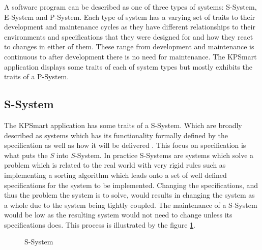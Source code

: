 \documentclass{style/CRPITStyle}
\renewcommand{\cite}{\citep}
\begin{document}
A software program can be described as one of three types of systems:
S-System, E-System and P-System. Each type of system has a varying set of traits
to their development and maintenance cycles as they have different relationships
to their environments and specifications that they were designed for and how
they react to changes in either of them. These range from development
and maintenance is continuous to after development there is no need for
maintenance. The KPSmart application displays some traits of each of system
types but mostly exhibits the traits of a P-System.

\subsection{S-System}

The KPSmart application has some traits of a S-System. Which are broadly described as
systems which has its functionality formally defined by the specification as
well as how it will be delivered \cite{lehman:1980}.
This focus on specification is what puts the \emph{S} into \emph{S}-System.
In practice S-Systems are systems which solve a problem which is related to the real world
with very rigid rules such as implementing a sorting algorithm which leads onto a set of well defined
specifications for the system to be implemented.
Changing the specifications, and thus the problem the system is to solve,
would results in changing the system as a whole due to the system being tightly
coupled. The maintenance of a S-System would be low as the resulting system
would not need to change unless its specifications does.
This process is illustrated by the figure \ref{s-system}.

\vspace{.1in}

\begin{figure}[htb]
\caption{\protect\label{s-system} S-System}
\end{figure}
\end{document}
